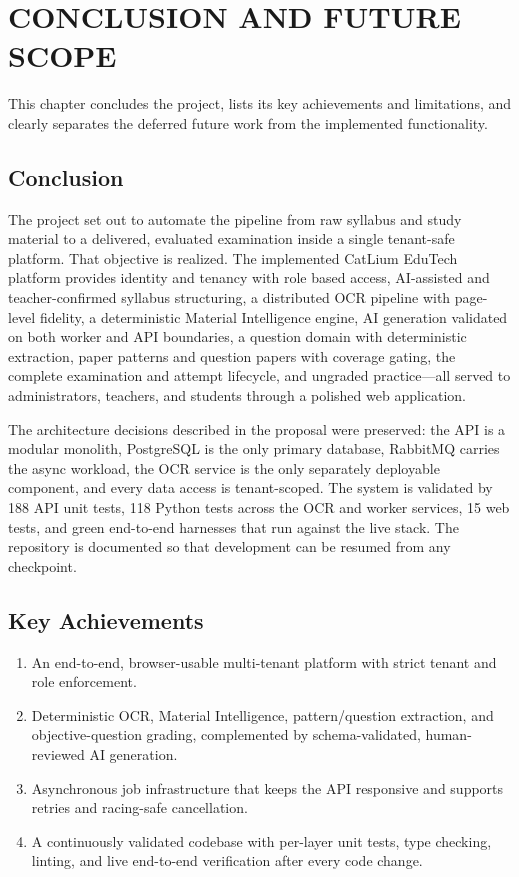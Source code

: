 \chapter{CONCLUSION AND FUTURE SCOPE}
\thispagestyle{empty}

This chapter concludes the project, lists its key achievements and
limitations, and clearly separates the deferred future work from the
implemented functionality.

\clearpage

\section{Conclusion}

The project set out to automate the pipeline from raw syllabus and study
material to a delivered, evaluated examination inside a single tenant-safe
platform. That objective is realized. The implemented CatLium EduTech
platform provides identity and tenancy with role based access, AI-assisted
and teacher-confirmed syllabus structuring, a distributed OCR pipeline with
page-level fidelity, a deterministic Material Intelligence engine, AI
generation validated on both worker and API boundaries, a question domain
with deterministic extraction, paper patterns and question papers with
coverage gating, the complete examination and attempt lifecycle, and
ungraded practice---all served to administrators, teachers, and students
through a polished web application.

The architecture decisions described in the proposal were preserved: the API
is a modular monolith, PostgreSQL is the only primary database, RabbitMQ
carries the async workload, the OCR service is the only separately deployable
component, and every data access is tenant-scoped. The system is validated by
188 API unit tests, 118 Python tests across the OCR and worker services, 15
web tests, and green end-to-end harnesses that run against the live stack.
The repository is documented so that development can be resumed from any
checkpoint.

\section{Key Achievements}

\begin{enumerate}
  \item An end-to-end, browser-usable multi-tenant platform with strict
        tenant and role enforcement.
  \item Deterministic OCR, Material Intelligence, pattern/question
        extraction, and objective-question grading, complemented by
        schema-validated, human-reviewed AI generation.
  \item Asynchronous job infrastructure that keeps the API responsive and
        supports retries and racing-safe cancellation.
  \item A continuously validated codebase with per-layer unit tests, type
        checking, linting, and live end-to-end verification after every code
        change.
\end{enumerate}

